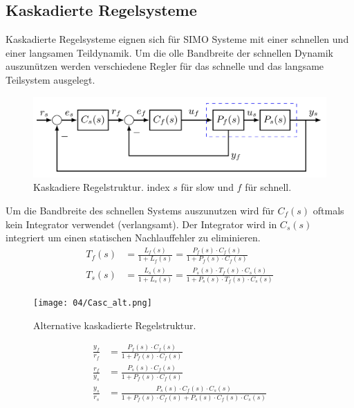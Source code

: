 \subsection{Kaskadierte Regelsysteme}
    Kaskadierte Regelsysteme eignen sich für SIMO Systeme mit einer schnellen und einer langsamen Teildynamik. Um die olle Bandbreite der schnellen Dynamik auszunützen werden verschiedene Regler für das schnelle und das langsame Teilsystem ausgelegt.
    
    \begin{figure}[H]
        \centering
        \includegraphics[width = 0.7\linewidth]{images/04/kaskad_sys.jpeg}
        \caption{Kaskadiere Regelstruktur. index $s$ für slow und $f$ für schnell.}
    \end{figure}
    Um die Bandbreite des schnellen Systems auszunutzen wird für $C_f(s)$ oftmals kein Integrator verwendet (verlangsamt). Der Integrator wird in $C_s(s)$ integriert um einen statischen Nachlauffehler zu eliminieren.
    \begin{align*}
        T_{f}(s) &= \frac{L_f(s)}{1 + L_f(s)} = \frac{P_f(s)\cdot C_f(s)}{1 + P_f(s)\cdot C_f(s)}\\
        T_{s}(s) &= \frac{L_s(s)}{1 + L_s(s)} = \frac{P_s(s)\cdot T_{f}(s)\cdot C_s(s)}{1 + P_s(s)\cdot T_f(s) \cdot C_s(s)}
    \end{align*}
    
    \begin{figure}[H]
        \centering
        \texttt{[image: 04/Casc\_alt.png]}
        \caption{Alternative kaskadierte Regelstruktur.}
        \label{fig:my_label}
    \end{figure}
    
    \begin{align*}
        \frac{y_f}{r_f} &= \frac{P_f(s)\cdot C_f(s)}{1 + P_f(s)\cdot C_f(s)}\\
        \frac{r_f}{y_s} &= \frac{P_s(s)\cdot C_f(s)}{1 + P_f(s)\cdot C_f(s)}\\
        \frac{y_s}{r_s} &= \frac{P_s(s)\cdot C_f(s) \cdot C_s(s)}{1 + P_f(s) \cdot C_f(s) + P_s(s) \cdot C_f(s) \cdot C_s(s)}
    \end{align*}
    
